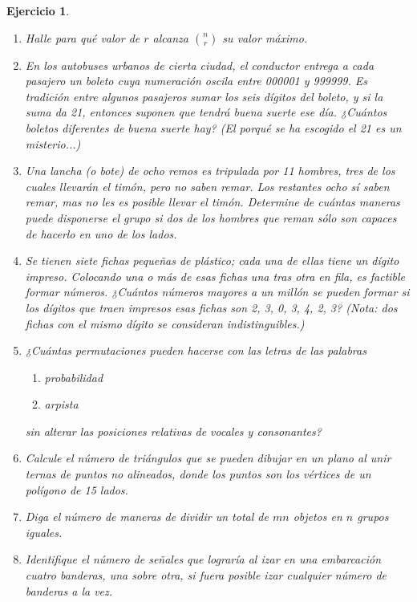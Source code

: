 \documentclass[12pt,twoside]{article}
\newtheorem{Ejer}{Ejercicio}
\begin{document}
\begin{Ejer}
\begin{enumerate}
\item Halle para qué valor de $r$ alcanza $\binom{n}{r}$ su valor máximo.

\item En los autobuses urbanos de cierta ciudad, el conductor entrega a cada pasajero un boleto cuya numeración oscila entre 000001 y 999999. Es tradición entre algunos pasajeros sumar los seis dígitos del boleto, y si la suma da 21, entonces suponen que tendrá buena suerte ese día. ¿Cuántos boletos diferentes de buena suerte hay? (El porqué se ha escogido el 21 es un misterio...)

\item Una lancha (o bote) de ocho remos es tripulada por 11 hombres, tres de los cuales llevarán el timón, pero no saben remar. Los restantes ocho sí saben remar, mas no les es posible llevar el timón. Determine de cuántas maneras puede disponerse el grupo si dos de los hombres que reman sólo son capaces de hacerlo en uno de los lados.

\item Se tienen siete fichas pequeñas de plástico; cada una de ellas tiene un dígito impreso. Colocando una o más de esas fichas una tras otra en fila, es factible formar números. ¿Cuántos números mayores a un millón se pueden formar si los dígitos que traen impresos esas fichas son 2, 3, 0, 3, 4, 2, 3? (Nota: dos fichas con el mismo dígito se consideran indistinguibles.)

\item ¿Cuántas permutaciones pueden hacerse con las letras de las palabras 
\begin{enumerate}
\item probabilidad
\item arpista
\end{enumerate}
sin alterar las posiciones relativas de vocales y consonantes?

\item Calcule el número de triángulos que se pueden dibujar en un plano al unir ternas de puntos no alineados, donde los puntos son los vértices de un polígono de 15 lados.

\item Diga el número de maneras de dividir un total de $mn$ objetos en $n$ grupos iguales.

\item Identifique el número de señales que lograría al izar en una embarcación cuatro banderas, una sobre otra, si fuera posible izar cualquier número de banderas a la vez.

\end{enumerate}
\end{Ejer}
\end{document}
